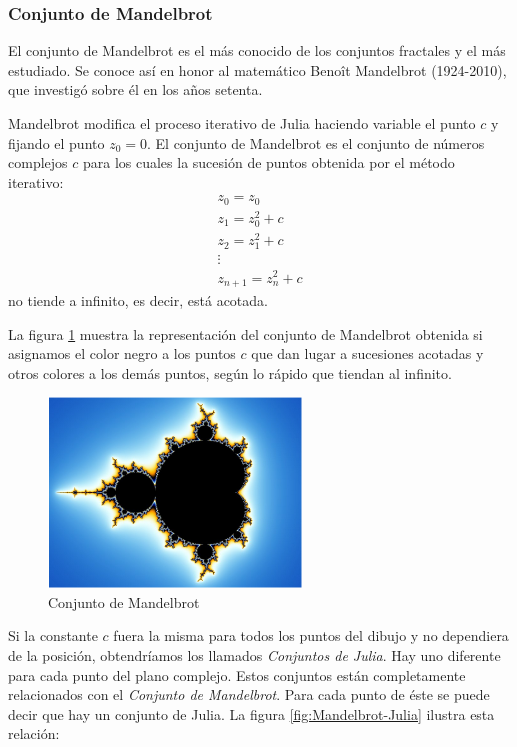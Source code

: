 \subsubsection{Conjunto de Mandelbrot}
\begin{definition}
El conjunto de Mandelbrot es el más conocido de los conjuntos fractales y el más estudiado. Se conoce así en honor al matemático Benoît Mandelbrot (1924-2010), que investigó sobre él en los años setenta.

Mandelbrot modifica el proceso iterativo de Julia haciendo variable el punto $c$ y fijando el punto $z_0=0$. El conjunto de Mandelbrot es el conjunto de números complejos $c$ para los cuales la sucesión de puntos obtenida por el método iterativo:
\[\begin{array}{l}
z_0=z_0\\
z_1=z_0^2+c \\
z_2 = z_1^2 + c \\
\vdots \\
z_{n+1} = z_n^2+c
\end{array}\]
no tiende a infinito, es decir, está acotada.
\end{definition}

La figura \ref{fig:Mandelbrot} muestra la representación del conjunto de Mandelbrot obtenida si asignamos el color negro a los puntos $c$ que dan lugar a sucesiones acotadas y otros colores a los demás puntos, según lo rápido que tiendan al infinito.

\begin{figure}[hbtp]
\centering
\includegraphics[width = 0.6\textwidth]{img/Mandelbrot_set.png}
\caption{Conjunto de Mandelbrot}
\label{fig:Mandelbrot}
\end{figure}

Si la constante $c$ fuera la misma para todos los puntos del dibujo y no dependiera de la posición, obtendríamos los llamados \emph{Conjuntos de Julia}. Hay uno diferente para cada punto del plano complejo. Estos conjuntos están completamente relacionados con el \emph{Conjunto de Mandelbrot}. Para cada punto de éste se puede decir que hay un conjunto de Julia. La figura \ref{fig:Mandelbrot-Julia} ilustra esta relación:

